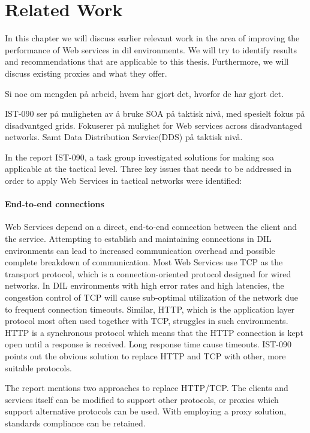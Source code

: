 \chapter{Related Work}

In this chapter we will discuss earlier relevant work in the area of improving
the performance of Web services in dil environments. We will try to identify
results and recommendations that are applicable to this thesis. Furthermore, we
will discuss existing proxies and what they offer.


Si noe om mengden på arbeid, hvem har gjort det, hvorfor de har gjort det.

IST-090 ser på muligheten av å bruke SOA på taktisk nivå, med spesielt fokus på
disadvantged grids. Fokuserer på mulighet for Web services across disadvantaged
networks. Samt Data Distribution Service(DDS) på taktisk nivå.

In the report IST-090, a task group investigated solutions for making \gls{soa}
applicable at the tactical level. Three key issues that needs to be addressed in
order to apply Web Services in tactical networks were
identified\cite{ist-118,ist-090}:

\label{section:DIL-problems}

\subsubsection{End-to-end connections}

Web Services depend on a direct, end-to-end connection between the client and
the service. Attempting to establish and maintaining connections in DIL
environments can lead to increased communication overhead and possible complete
breakdown of communication. Most Web Services use TCP as the transport protocol,
which is a connection-oriented protocol designed for wired networks. In DIL
environments with high error rates and high latencies, the congestion control of
TCP will cause sub-optimal utilization of the network due to frequent connection
timeouts. Similar, HTTP, which is the application layer protocol most often
used together with TCP, struggles in such environments. HTTP is a synchronous
protocol which means that the HTTP connection is kept open until a response is
received. Long response time cause timeouts. IST-090 points out the obvious
solution to replace HTTP and TCP with other, more suitable protocols.

The report mentions two approaches to replace HTTP/TCP. The clients and services
itself can be modified to support other protocols, or proxies which support
alternative protocols can be used. With employing a proxy solution, standards
compliance can be retained.


